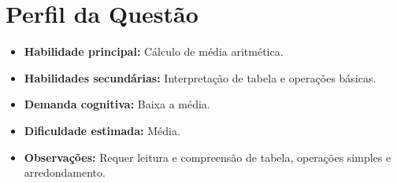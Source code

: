 \documentclass{article}
\begin{document}
\section*{Perfil da Questão}
\begin{itemize}
  \item \textbf{Habilidade principal:} Cálculo de média aritmética.
  \item \textbf{Habilidades secundárias:} Interpretação de tabela e operações básicas.
  \item \textbf{Demanda cognitiva:} Baixa a média.
  \item \textbf{Dificuldade estimada:} Média.
  \item \textbf{Observações:} Requer leitura e compreensão de tabela, operações simples e arredondamento.
\end{itemize}
\end{document}
